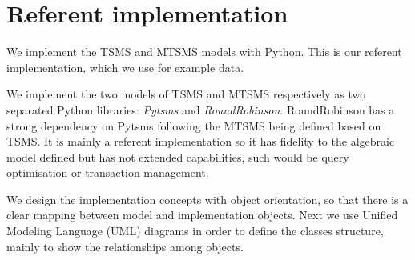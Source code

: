 







\section{Referent implementation}
\label{sec:implementation}

We implement the TSMS and MTSMS models with Python. This is our
referent implementation, which we use for example data.  

We implement the two models of TSMS and MTSMS respectively as two
separated Python libraries: \emph{Pytsms} and \emph{RoundRobinson}.
RoundRobinson has a strong dependency on Pytsms following the MTSMS
being defined based on TSMS.  It is mainly a referent implementation
so it has fidelity to the algebraic model defined but has not extended
 capabilities, such would be query optimisation or
transaction management.

We design the implementation concepts with object orientation, so that
there is a clear mapping between model and implementation
objects. Next we use Unified Modeling Language (UML) diagrams in order
to define the classes structure, mainly to show the relationships
among objects.




